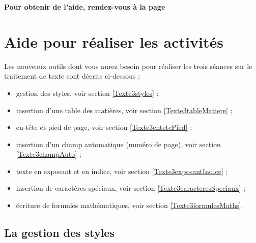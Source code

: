 \textbf{Pour obtenir de l'aide, rendez-vous à la page \pageref{aide_seancesWord3}}

\vfill



\newpage



\section{Aide pour réaliser les activités}\label{aide_seancesWord3}


Les nouveaux outils dont vous aurez besoin pour réaliser les trois séances sur le traitement de texte sont décrits ci-dessous :


\begin{itemize}   
\item gestion des styles, voir section \vref{Texte3styles} ;
\item insertion d'une table des matières, voir section \vref{Texte3tableMatiere} ;
\item en-tête et pied de page, voir section \vref{Texte3entetePied} ;
\item insertion d'un champ automatique (numéro de page), voir section \vref{Texte3champAuto} ;
\item texte en exposant et en indice, voir section \vref{Texte3exposantIndice} ;
\item insertion de caractères spéciaux, voir section \vref{Texte3caracteresSpeciaux} ; 
\item écriture de formules mathématiques, voir section \vref{Texte3formulesMaths}. 
\end{itemize}  




\subsection{La gestion des styles}\label{Texte3styles}

